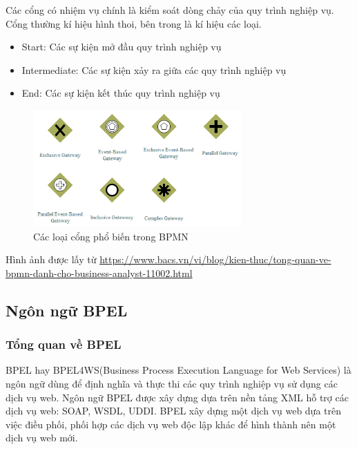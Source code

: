 Các cổng có nhiệm vụ chính là kiểm soát dòng chảy của quy trình nghiệp vụ. Cổng thường kí hiệu hình thoi, bên trong là kí hiệu các loại.
\begin{itemize}
	\item Start: Các sự kiện mở đầu quy trình nghiệp vụ
	\item Intermediate: Các sự kiện xảy ra giữa các quy trình nghiệp vụ
	\item End: Các sự kiện kết thúc quy trình nghiệp vụ
\end{itemize}
\begin{figure}[!htp]
	\begin{center}
		\includegraphics[width=8cm]{img/theory/BPMN/Gateway.png}
	\end{center}
	\caption{Các loại cổng phổ biến trong BPMN}
\end{figure}
\begin{flushleft}
	Hình ảnh được lấy từ \url{https://www.bacs.vn/vi/blog/kien-thuc/tong-quan-ve-bpmn-danh-cho-business-analyst-11002.html}
\end{flushleft}



\subsection{Ngôn ngữ BPEL}
\subsubsection{Tổng quan về BPEL}
\hspace*{0.5cm} BPEL hay BPEL4WS(Business Process Execution Language for Web Services) là ngôn ngữ dùng để định nghĩa và thực thi các quy trình nghiệp vụ sử dụng các dịch vụ web. Ngôn ngữ BPEL được xây dựng dựa trên nền tảng XML hỗ trợ các dịch vụ web: SOAP, WSDL, UDDI. BPEL xây dựng một dịch vụ web dựa trên việc điều phối, phối hợp các dịch vụ web độc lập khác để hình thành nên một dịch vụ web mới.
